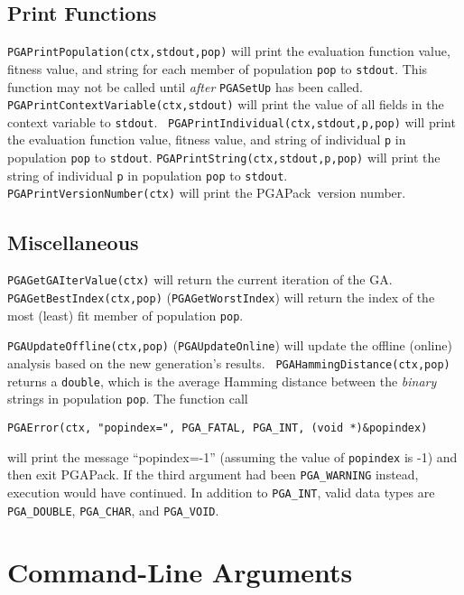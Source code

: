 \documentclass{report}
\newcommand{\pga}{PGAPack}
\begin{document}
\subsection{Print Functions}\label{subsec:print-functions}

{\tt PGAPrintPopulation(ctx,stdout,pop)} will print the evaluation function
value, fitness value, and string for each member of population {\tt pop} to
{\tt stdout}. This function may not be called until {\em after} {\tt PGASetUp}
has been called. {\tt PGAPrintContextVariable(ctx,stdout)} will print the
value of all fields in the context variable to {\tt stdout}.  {\tt
PGAPrintIndividual(ctx,stdout,p,pop)} will print the evaluation function
value, fitness value, and string of individual {\tt p} in population {\tt pop}
to {\tt stdout}.  {\tt PGAPrintString(ctx,stdout,p,pop)} will print the string
of individual {\tt p} in population {\tt pop} to {\tt stdout}.  {\tt
PGAPrintVersionNumber(ctx)} will print the \pga\ version number.


\subsection{Miscellaneous}\label{subsec:other}

\begin{sloppypar}
{\tt PGAGetGAIterValue(ctx)} will return the current iteration of the
GA.  {\tt PGAGetBestIndex(ctx,pop)} ({\tt PGAGetWorstIndex}) will return
the index of the most (least) fit member of population {\tt pop}.
\end{sloppypar}

{\tt PGAUpdateOffline(ctx,pop)} ({\tt PGAUpdateOnline}) will update the offline
(online) analysis based on the new generation's results.  {\tt
PGAHammingDistance(ctx,pop)} returns a {\tt double}, which is the average
Hamming distance between the {\em binary} strings in population {\tt pop}.
The function call
\begin{verbatim}
PGAError(ctx, "popindex=", PGA_FATAL, PGA_INT, (void *)&popindex)
\end{verbatim}
will print the message ``popindex=-1'' (assuming the value of {\tt popindex}
is -1) and then exit \pga.  If the third argument had been {\tt PGA\_WARNING}
instead, execution would have continued.  In addition to {\tt PGA\_INT}, valid data
types are {\tt PGA\_DOUBLE}, {\tt PGA\_CHAR}, and {\tt PGA\_VOID}.


\section{Command-Line Arguments}\label{sec:cla}
\end{document}
